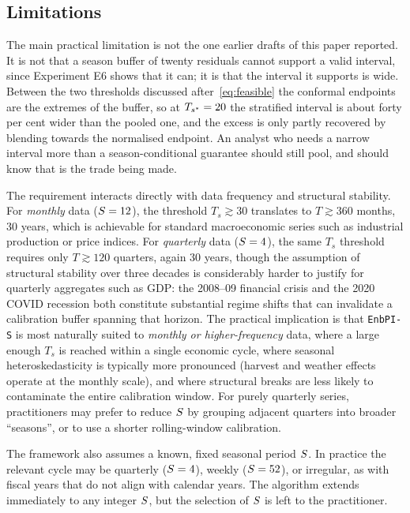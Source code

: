 \subsection{Limitations}
\label{sec:conclusion:limitations}

The main practical limitation is not the one earlier drafts of this
paper reported.  It is not that a season buffer of twenty residuals
cannot support a valid interval, since Experiment E6 shows that it can;
it is that the interval it supports is wide.  Between the two
thresholds discussed after~\eqref{eq:feasible} the conformal endpoints are the
extremes of the buffer, so at $T_{s^*} = 20$ the stratified interval is
about forty per cent wider than the pooled one, and the excess is only
partly recovered by blending towards the normalised endpoint.  An
analyst who needs a narrow interval more than a season-conditional
guarantee should still pool, and should know that is the trade being
made.

The requirement interacts directly with data frequency and
structural stability.  For \emph{monthly} data ($S = 12$), the
threshold $T_s \gtrsim 30$ translates to $T \gtrsim 360$ months,
30 years, which is achievable for standard macroeconomic series such
as industrial production or price indices.  For \emph{quarterly} data
($S = 4$), the same $T_s$ threshold requires only
$T \gtrsim 120$ quarters, again 30 years, though the assumption of
structural stability over three decades is considerably harder to
justify for quarterly aggregates such as GDP: the 2008--09 financial
crisis and the 2020 COVID recession both constitute substantial
regime shifts that can invalidate a calibration buffer spanning that
horizon.  The practical implication is that \texttt{EnbPI-S} is most
naturally suited to \emph{monthly or higher-frequency} data, where a
large enough $T_s$ is reached within a single economic cycle, where
seasonal het\-ero\-sked\-as\-tic\-ity is typically more pronounced
(harvest and weather effects operate at the monthly scale), and where
structural breaks are less likely to contaminate the entire
calibration window.  For purely quarterly series, practitioners may
prefer to reduce $S$ by grouping adjacent quarters into broader
``seasons'', or to use a shorter rolling-window calibration.

The framework also assumes a known, fixed seasonal period $S$.
In practice the relevant cycle may be quarterly ($S = 4$),
weekly ($S = 52$), or irregular, as with fiscal years that do
not align with calendar years.  The algorithm extends immediately to
any integer $S$, but the selection of $S$ is left to the
practitioner.

